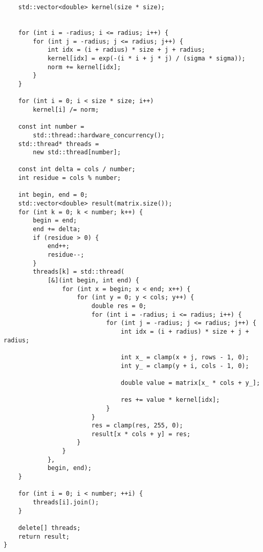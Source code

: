 \documentclass{report}
\begin{document}
\begin{lstlisting}
    std::vector<double> kernel(size * size);


    for (int i = -radius; i <= radius; i++) {
        for (int j = -radius; j <= radius; j++) {
            int idx = (i + radius) * size + j + radius;
            kernel[idx] = exp(-(i * i + j * j) / (sigma * sigma));
            norm += kernel[idx];
        }
    }

    for (int i = 0; i < size * size; i++)
        kernel[i] /= norm;

    const int number =
        std::thread::hardware_concurrency();
    std::thread* threads =
        new std::thread[number];

    const int delta = cols / number;
    int residue = cols % number;

    int begin, end = 0;
    std::vector<double> result(matrix.size());
    for (int k = 0; k < number; k++) {
        begin = end;
        end += delta;
        if (residue > 0) {
            end++;
            residue--;
        }
        threads[k] = std::thread(
            [&](int begin, int end) {
                for (int x = begin; x < end; x++) {
                    for (int y = 0; y < cols; y++) {
                        double res = 0;
                        for (int i = -radius; i <= radius; i++) {
                            for (int j = -radius; j <= radius; j++) {
                                int idx = (i + radius) * size + j + radius;

                                int x_ = clamp(x + j, rows - 1, 0);
                                int y_ = clamp(y + i, cols - 1, 0);

                                double value = matrix[x_ * cols + y_];

                                res += value * kernel[idx];
                            }
                        }
                        res = clamp(res, 255, 0);
                        result[x * cols + y] = res;
                    }
                }
            },
            begin, end);
    }

    for (int i = 0; i < number; ++i) {
        threads[i].join();
    }

    delete[] threads;
    return result;
}
	
\end{lstlisting}
\end{document}
